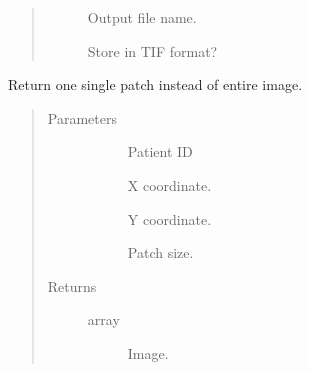 \documentclass[letterpaper,10pt,english]{sphinxmanual}
\begin{document}
\begin{fulllineitems}
\begin{fulllineitems}
\begin{quote}
\begin{description}
\begin{description}
\item[{}] \leavevmode
Output file name.

\item[{}] \leavevmode
Store in TIF format?

\end{description}

\end{description}\end{quote}

\end{fulllineitems}


\begin{fulllineitems}
\label{\detokenize{index:pathflowai.visualize.PredictionPlotter.return_patch}}
Return one single patch instead of entire image.
\begin{quote}\begin{description}
\item[{Parameters}] \leavevmode\begin{description}
\item[{}] \leavevmode
Patient ID

\item[{}] \leavevmode
X coordinate.

\item[{}] \leavevmode
Y coordinate.

\item[{}] \leavevmode
Patch size.

\end{description}

\item[{Returns}] \leavevmode\begin{description}
\item[{array}] \leavevmode
Image.

\end{description}

\end{description}\end{quote}

\end{fulllineitems}


\end{fulllineitems}
\end{document}
